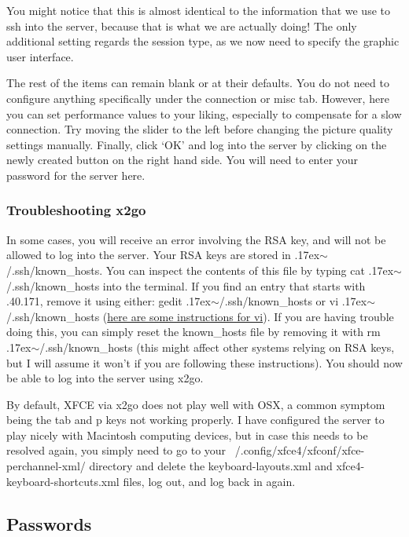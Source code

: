 \documentclass[final,titlepage,letterpaper,oneside,12pt]{article}
\renewcommand{\texttt}[2][BrickRed]{\textcolor{#1}{\ttfamily #2}}%
\newcommand{\atilde}{\raise.17ex\hbox{$\scriptstyle\mathtt{\sim}$}}
\begin{document}
You might notice that this is almost identical to the information that we use to \texttt{ssh} into the server, because that is what we are actually doing! The only additional setting regards the \texttt{session type}, as we now need to specify the graphic user interface.

The rest of the items can remain blank or at their defaults. You do not need to configure anything specifically under the connection or misc tab. However, here you can set performance values to your liking, especially to compensate for a slow connection. Try moving the slider to the left before changing the picture quality settings manually. Finally, click `OK' and log into the server by clicking on the newly created button on the right hand side. You will need to enter your password for the server here.

\subsubsection{Troubleshooting x2go}

In some cases, you will receive an error involving the RSA key, and will not be allowed to log into the server. Your RSA keys are stored in \texttt{\atilde/.ssh/known\_hosts}. You can inspect the contents of this file by typing \texttt{cat \atilde/.ssh/known\_hosts} into the terminal. If you find an entry that starts with \texttt{130.63.40.171}, remove it using either: \texttt{gedit \atilde/.ssh/known\_hosts} or \texttt{vi \atilde/.ssh/known\_hosts} (\href{http://glaciated.org/vi/}{here are some instructions for vi}). If you are having trouble doing this, you can simply reset the \texttt{known\_hosts} file by removing it with \texttt{rm \atilde/.ssh/known\_hosts} (this might affect other systems relying on RSA keys, but I will assume it won't if you are following these instructions). You should now be able to log into the server using x2go.

By default, XFCE via x2go does not play well with OSX, a common symptom being the \texttt{tab} and \texttt{p} keys not working properly. I have configured the server to play nicely with Macintosh computing devices, but in case this needs to be resolved again, you simply need to go to your \texttt{~/.config/xfce4/xfconf/xfce-perchannel-xml/} directory and delete the \texttt{keyboard-layouts.xml} and \texttt{xfce4-keyboard-shortcuts.xml} files, log out, and log back in again.

\subsection{Passwords}
\end{document}

